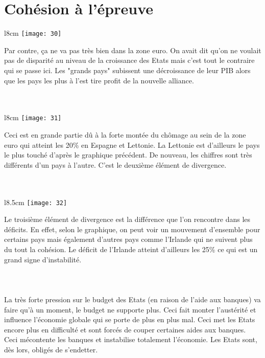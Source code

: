 \section{Cohésion à l'épreuve}

\begin{wrapfigure}[7]{l}{8cm}
	\texttt{[image: 30]}
\end{wrapfigure}
\noindent Par contre, ça ne va pas très bien dans la zone euro. On avait dit qu'on ne voulait pas de disparité au niveau de la croissance des Etats mais c'est tout le contraire qui se passe ici. Les "grands pays" subissent une décroissance de leur PIB alors que les pays les plus à l'est tire profit de la nouvelle alliance. \\\\\\

\begin{wrapfigure}[7]{l}{8cm}
	\texttt{[image: 31]}
\end{wrapfigure}
\noindent Ceci est en grande partie dû à la forte montée du chômage au sein de la zone euro qui atteint les 20\% en Espagne et Lettonie. La Lettonie est d'ailleurs le pays le plus touché d'après le graphique précédent. De nouveau, les chiffres sont très différents d'un pays à l'autre. C'est le deuxième élément de divergence. \\\\\\

\begin{wrapfigure}[11]{l}{8.5cm}
	\texttt{[image: 32]}
\end{wrapfigure}
\noindent Le troisième élément de divergence est la différence que l'on rencontre dans les déficits. En effet, selon le graphique, on peut voir un mouvement d'ensemble pour certains pays mais également d'autres pays comme l'Irlande qui ne suivent plus du tout la cohésion. Le déficit de l'Irlande atteint d'ailleurs les 25\% ce qui est un grand signe d'instabilité. \\\\\\\\

La très forte pression sur le budget des Etats (en raison de l'aide aux banques) va faire qu'à un moment, le budget ne supporte plus. Ceci fait monter l'austérité et influence l'économie globale qui se porte de plus en plus mal. Ceci met les Etats encore plus en difficulté  et sont forcés de couper certaines aides aux banques. Ceci mécontente les banques et instabilise totalement l'économie. Les Etats sont, dès lors, obligés de s'endetter.

